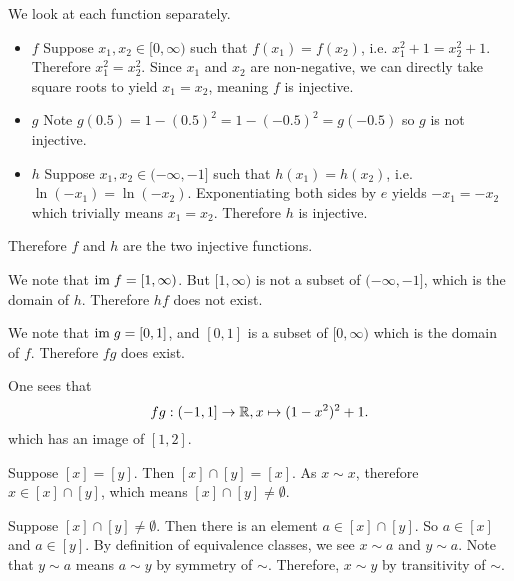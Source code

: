 \begin{questions}
    \item \begin{partquestions}{\alph*}
        \item We look at each function separately.
        \begin{itemize}
            \item $\boxed{f}$ Suppose $x_1,x_2 \in [0,\infty)$ such that $f(x_1) = f(x_2)$, i.e. $x_1^2 + 1 = x_2^2 + 1$. Therefore $x_1^2 = x_2^2$. Since $x_1$ and $x_2$ are non-negative, we can directly take square roots to yield $x_1 = x_2$, meaning $f$ is injective.
            \item $\boxed{g}$ Note $g(0.5) = 1-(0.5)^2 = 1 - (-0.5)^2 = g(-0.5)$ so $g$ is not injective.
            \item $\boxed{h}$ Suppose $x_1,x_2 \in (-\infty, -1]$ such that $h(x_1) = h(x_2)$, i.e. $\ln(-x_1) = \ln(-x_2)$. Exponentiating both sides by $e$ yields $-x_1 = -x_2$ which trivially means $x_1 = x_2$. Therefore $h$ is injective.
        \end{itemize}
        Therefore $f$ and $h$ are the two injective functions.

        \item We note that $\mathrm{im}\; f = [1, \infty)$. But $[1, \infty)$ is not a subset of $(-\infty, -1]$, which is the domain of $h$. Therefore $hf$ does not exist.

        \item We note that $\mathrm{im}\; g = [0, 1]$, and $[0, 1]$ is a subset of $[0, \infty)$ which is the domain of $f$. Therefore $fg$ does exist.

        One sees that
        \[
            fg: (-1, 1] \to \mathbb{R}, x \mapsto (1-x^2)^2 + 1.
        \]
        which has an image of $[1, 2]$.
    \end{partquestions}

    \item \begin{partquestions}{\alph*}
        \item Suppose $[x] = [y]$. Then $[x] \cap [y] = [x]$. As $x \sim x$, therefore $x \in [x] \cap [y]$, which means $[x] \cap [y] \neq \emptyset$.

        \item Suppose $[x] \cap [y] \neq \emptyset$. Then there is an element $a \in [x] \cap [y]$. So $a \in [x]$ and $a \in [y]$. By definition of equivalence classes, we see $x \mathrel{\sim} a$ and $y \mathrel{\sim} a$. Note that $y \mathrel{\sim} a$ means $a \mathrel{\sim} y$ by symmetry of $\sim$. Therefore, $x \mathrel{\sim} y$ by transitivity of $\sim$.


\end{partquestions}
\end{questions}
